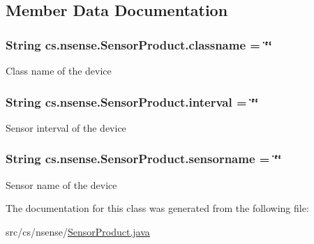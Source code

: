 \subsection{Member Data Documentation}
\hypertarget{classcs_1_1nsense_1_1_sensor_product_a2e000b524373c9f860222c2198153d2f}{
\subsubsection[{classname}]{\setlength{\rightskip}{0pt plus 5cm}String cs.\-nsense.\-Sensor\-Product.\-classname = \char`\"{}\char`\"{}\hspace{0.3cm}{\ttfamily [private]}}}\label{classcs_1_1nsense_1_1_sensor_product_a2e000b524373c9f860222c2198153d2f}
Class name of the device \hypertarget{classcs_1_1nsense_1_1_sensor_product_ac5bb060ad08911197b4de5719698f83b}{
\subsubsection[{interval}]{\setlength{\rightskip}{0pt plus 5cm}String cs.\-nsense.\-Sensor\-Product.\-interval = \char`\"{}\char`\"{}\hspace{0.3cm}{\ttfamily [private]}}}\label{classcs_1_1nsense_1_1_sensor_product_ac5bb060ad08911197b4de5719698f83b}
Sensor interval of the device \hypertarget{classcs_1_1nsense_1_1_sensor_product_aaf4e64e6a738e7e3f1029379e2d33556}{
\subsubsection[{sensorname}]{\setlength{\rightskip}{0pt plus 5cm}String cs.\-nsense.\-Sensor\-Product.\-sensorname = \char`\"{}\char`\"{}\hspace{0.3cm}{\ttfamily [private]}}}\label{classcs_1_1nsense_1_1_sensor_product_aaf4e64e6a738e7e3f1029379e2d33556}
Sensor name of the device 

The documentation for this class was generated from the following file\-:\begin{DoxyCompactItemize}
\item 
src/cs/nsense/\hyperlink{_sensor_product_8java}{Sensor\-Product.\-java}\end{DoxyCompactItemize}
